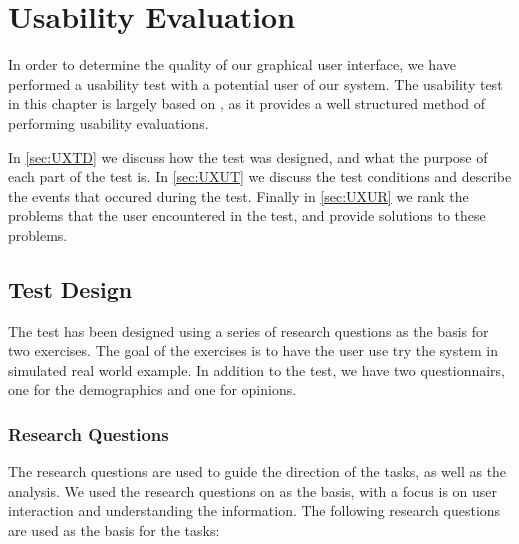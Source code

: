 \chapter{Usability Evaluation}\label{cha:usability}

In order to determine the quality of our graphical user interface, we have
performed a usability test with a potential user of our system. The usability
test in this chapter is largely based on \citep[p. 65-72 and 269-275]{UXBook},
as it provides a well structured method of performing usability evaluations.\nl

In \autoref{sec:UXTD} we discuss how the test was designed, and what the purpose
of each part of the test is. In \autoref{sec:UXUT} we discuss the test
conditions and describe the events that occured during the test.
Finally in \autoref{sec:UXUR} we rank the problems that the user encountered in
the test, and provide solutions to these problems.

\section{Test Design}\label{sec:UXTD}
The test has been designed using a series of research questions as the basis
for two exercises. The goal of the exercises is to have the user use try the
system in simulated real world example. In addition to the test, we have two
questionnairs, one for the demographics and one for opinions.

\subsection{Research Questions}\label{subsec:UXRQ}
The research questions are used to guide the direction of the tasks, as well as
the analysis. We used the research questions on \citep[p. 70-71]{UXBook} as the
basis, with a focus is on user interaction and understanding the information.
The following research questions are used as the basis for the tasks:

